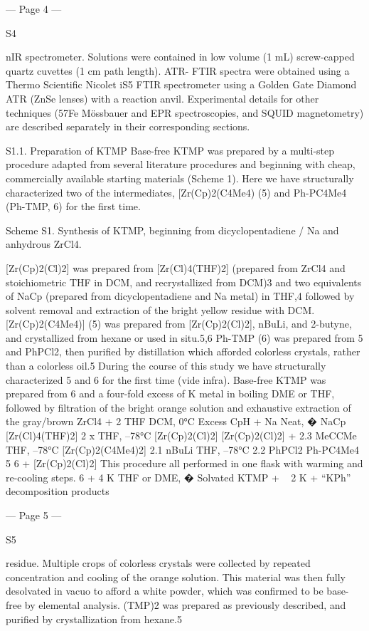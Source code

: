 --- Page 4 ---
 
 
S4 
 
 
nIR spectrometer. Solutions were contained in low volume (1 mL) screw-capped quartz cuvettes (1 cm path length). ATR-
FTIR spectra were obtained using a Thermo Scientific Nicolet iS5 FTIR spectrometer using a Golden Gate Diamond ATR 
(ZnSe lenses) with a reaction anvil. Experimental details for other techniques (57Fe Mössbauer and EPR spectroscopies, and 
SQUID magnetometry) are described separately in their corresponding sections. 
 
S1.1. Preparation of KTMP 
Base-free KTMP was prepared by a multi-step procedure adapted from several literature procedures and beginning with cheap, 
commercially available starting materials (Scheme 1). Here we have structurally characterized two of the intermediates, 
[Zr(Cp)2(C4Me4) (5) and Ph-PC4Me4 (Ph-TMP, 6) for the first time. 
 
 
Scheme S1. Synthesis of KTMP, beginning from dicyclopentadiene / Na and anhydrous ZrCl4. 
 
[Zr(Cp)2(Cl)2] was prepared from [Zr(Cl)4(THF)2] (prepared from ZrCl4 and stoichiometric THF in DCM, and recrystallized 
from DCM)3 and two equivalents of NaCp (prepared from dicyclopentadiene and Na metal) in THF,4 followed by solvent 
removal and extraction of the bright yellow residue with DCM. [Zr(Cp)2(C4Me4)] (5) was prepared from [Zr(Cp)2(Cl)2], nBuLi, 
and 2-butyne, and crystallized from hexane or used in situ.5,6 Ph-TMP (6) was prepared from 5 and PhPCl2, then purified by 
distillation which afforded colorless crystals, rather than a colorless oil.5 During the course of this study we have structurally 
characterized 5 and 6 for the first time (vide infra). Base-free KTMP was prepared from 6 and a four-fold excess of K metal 
in boiling DME or THF, followed by filtration of the bright orange solution and exhaustive extraction of the gray/brown 
ZrCl4 + 2 THF
DCM, 0°C
Excess CpH + Na
Neat, �
NaCp
[Zr(Cl)4(THF)2]
2 x
THF, –78°C
[Zr(Cp)2(Cl)2]
[Zr(Cp)2(Cl)2] + 2.3 MeCCMe
THF, –78°C
[Zr(Cp)2(C4Me4)2]
2.1 nBuLi
THF, –78°C
2.2 PhPCl2 Ph-PC4Me4
5
6
+ [Zr(Cp)2(Cl)2]
This procedure all performed in one flask with warming and re-cooling steps.
6 + 4 K
THF or DME, �
Solvated KTMP + ~ 2 K + “KPh” decomposition products


--- Page 5 ---
 
 
S5 
 
 
residue. Multiple crops of colorless crystals were collected by repeated concentration and cooling of the orange solution. This 
material was then fully desolvated in vacuo to afford a white powder, which was confirmed to be base-free by elemental 
analysis. (TMP)2 was prepared as previously described, and purified by crystallization from hexane.5 
 
